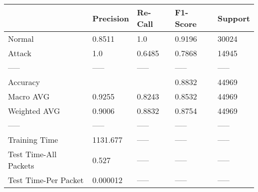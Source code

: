 \begin{tabular}{lllll}
\toprule
{} & Precision & Re-Call & F1-Score & Support \\
\midrule
Normal                &    0.8511 &     1.0 &   0.9196 &   30024 \\
Attack                &       1.0 &  0.6485 &   0.7868 &   14945 \\
-----                 &     ----- &   ----- &    ----- &   ----- \\
Accuracy              &           &         &   0.8832 &   44969 \\
Macro AVG             &    0.9255 &  0.8243 &   0.8532 &   44969 \\
Weighted AVG          &    0.9006 &  0.8832 &   0.8754 &   44969 \\
-----                 &     ----- &   ----- &    ----- &   ----- \\
Training Time         &  1131.677 &   ----- &    ----- &   ----- \\
Test Time-All Packets &     0.527 &   ----- &    ----- &   ----- \\
Test Time-Per Packet  &  0.000012 &   ----- &    ----- &   ----- \\
\bottomrule
\end{tabular}

